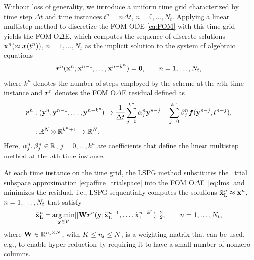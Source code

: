 \documentclass[3p,computermodern,10pt]{elsarticle}
\begin{document}
Without loss of generality, we introduce a uniform time
grid characterized by time step $\Delta t$ and time instances
$t^n = n\Delta
t$, $n=0,\ldots,N_t$.
Applying a linear multistep method to discretize the FOM ODE \eqref{eq:FOM}
with this time grid
yields the FOM O$\Delta$E, which computes the sequence of discrete
solutions
${\mathbf{x}}^{n}( \approx {\boldsymbol x}(t^n))$, $n=1,\ldots,N_t$
as the implicit solution to the system of algebraic equations
\begin{equation}\label{eq:lms}
\boldsymbol r_{}^{n}
	({\mathbf{x}}^{n};{\mathbf{x}}^{n-1},\ldots,{\mathbf{x}}^{n-k^n})
	= \boldsymbol 0,\qquad n=1,\ldots,N_t,
\end{equation}
where  $k^n$ denotes the number of steps employed by the scheme at the $n$th
time instance and 
$\boldsymbol r_{}^{n}$ denotes the FOM O$\Delta$E residual defined as
\begin{align*}
\boldsymbol r_{}^{n} &: (\mathbf{y}^{n};\mathbf{y}^{n-1},\ldots,\mathbf{y}^{n-k^n}) \mapsto  \frac{1}{\Delta t} \sum_{j=0}^{k^n} \alpha^n_j \mathbf{y}^{n-j} -  \sum_{j=0}^{k^n} \beta^n_j \boldsymbol f(\mathbf{y}^{n-j},t^{n-j}),
\\
&: \mathbb{R}^{N} \otimes \mathbb{R}^{k^n + 1} \rightarrow \mathbb{R}^{N}.
\end{align*} 
Here, $\alpha^n_j,\beta^n_j\in\mathbb{R}^{}$, $j=0,\ldots,k^n$ are coefficients
that define the linear multistep method at the $n$th time instance.

At each time instance on the time grid, the LSPG method substitutes the \spatialAcronym\ trial subspace approximation
\eqref{eq:affine_trialspace} into the FOM O$\Delta$E~\eqref{eq:lms} and
minimizes the residual, i.e., LSPG sequentially computes the solutions
$\tilde{\mathbf{x}}_{\text{L}}^n \approx {\mathbf{x}}^{n}$, $n=1,\ldots,
N_t$ that satisfy
\begin{equation*}
\tilde{\mathbf{x}}_{\text{L}}^n = \underset{\mathbf{y} \in \mathcal{V }  }{\text{arg\,min}}|| \mathbf{W}\boldsymbol r_{}^{n} (\mathbf{y}; \tilde{\mathbf{x}}_{\text{L}}^{n-1},\ldots,\tilde{\mathbf{x}}_{\text{L}}^{n-k^n}) ||_2^2, \qquad n = 1,\ldots,N_t,
\end{equation*}
where 
$\mathbf{W} \in \mathbb{R}^{n_s \times N}$, with $K
\le n_s \le N$, is a weighting matrix that can be used, e.g., to
enable hyper-reduction by requiring it to have a small number of nonzero
columns. 
\end{document}
